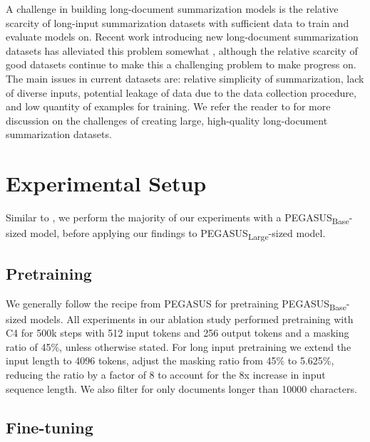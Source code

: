 \documentclass[11pt]{article}
\newcommand{\pegasuslarge}{PEGASUS\textsubscript{Large}}
\newcommand{\pegasusbase}{PEGASUS\textsubscript{Base}}
\begin{document}
A challenge in building long-document summarization models is the relative scarcity of long-input summarization datasets with sufficient data to train and evaluate models on.
Recent work introducing new long-document summarization datasets has alleviated this problem somewhat \citep{chen2022summscreen, shaham2022scrolls,kryscinski2021booksum}, although the relative scarcity of good datasets continue to make this a challenging problem to make progress on.
The main issues in current datasets are: relative simplicity of summarization, lack of diverse inputs, potential leakage of data due to the data collection procedure, and low quantity of examples for training.
We refer the reader to \citet{wang2022squality} for more discussion on the challenges of creating large, high-quality long-document summarization datasets.













\section{Experimental Setup}

Similar to \citet{zhang2019pegasus}, we perform the majority of our experiments with a \pegasusbase{}-sized model, before applying our findings to \pegasuslarge-sized model.

\subsection{Pretraining}

\label{sec:exp_pretraining}

We generally follow the recipe from PEGASUS \citep{zhang2019pegasus} for pretraining \pegasusbase{}-sized models.
All experiments in our ablation study performed pretraining with C4 \citep{raffel2020t5} for 500k steps with 512 input tokens and 256 output tokens and a masking ratio of 45\%, unless otherwise stated.
For long input pretraining we extend the input length to 4096 tokens, adjust the masking ratio from 45\% to 5.625\%, reducing the ratio by a factor of 8 to account for the 8x increase in input sequence length.
We also filter for only documents longer than 10000 characters.

\subsection{Fine-tuning}
\end{document}
